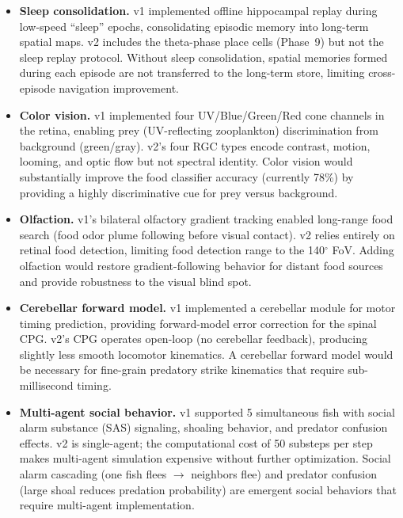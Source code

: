 \documentclass[11pt,a4paper]{article}
\begin{document}
\begin{itemize}[nosep,leftmargin=2em]
  \item \textbf{Sleep consolidation.}
    v1 implemented offline hippocampal replay during low-speed
    ``sleep'' epochs, consolidating episodic memory into long-term
    spatial maps.
    v2 includes the theta-phase place cells (Phase~9) but not the
    sleep replay protocol.
    Without sleep consolidation, spatial memories formed during
    each episode are not transferred to the long-term store,
    limiting cross-episode navigation improvement.

  \item \textbf{Color vision.}
    v1 implemented four UV/Blue/Green/Red cone channels in the
    retina, enabling prey (UV-reflecting zooplankton) discrimination
    from background (green/gray).
    v2's four RGC types encode contrast, motion, looming, and optic
    flow but not spectral identity.
    Color vision would substantially improve the food classifier
    accuracy (currently 78\%) by providing a highly discriminative
    cue for prey versus background.

  \item \textbf{Olfaction.}
    v1's bilateral olfactory gradient tracking enabled long-range
    food search (food odor plume following before visual contact).
    v2 relies entirely on retinal food detection, limiting food
    detection range to the 140$^\circ$ FoV.
    Adding olfaction would restore gradient-following behavior
    for distant food sources and provide robustness to the visual
    blind spot.

  \item \textbf{Cerebellar forward model.}
    v1 implemented a cerebellar module for motor timing prediction,
    providing forward-model error correction for the spinal CPG.
    v2's CPG operates open-loop (no cerebellar feedback), producing
    slightly less smooth locomotor kinematics.
    A cerebellar forward model would be necessary for fine-grain
    predatory strike kinematics that require sub-millisecond timing.

  \item \textbf{Multi-agent social behavior.}
    v1 supported 5 simultaneous fish with social alarm substance
    (SAS) signaling, shoaling behavior, and predator confusion
    effects.
    v2 is single-agent; the computational cost of 50 substeps per
    step makes multi-agent simulation expensive without further
    optimization.
    Social alarm cascading (one fish flees $\to$ neighbors flee)
    and predator confusion (large shoal reduces predation probability)
    are emergent social behaviors that require multi-agent
    implementation.
\end{itemize}
\end{document}
